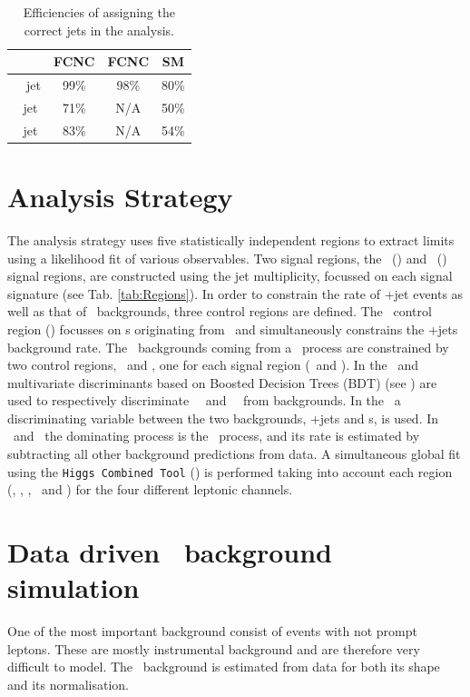 \begin{table}[htbp]
	\centering
	\caption{Efficiencies of assigning the correct jets in the analysis.}
	\begin{tabular}{cccc}
		\toprule
		& FCNC \tZq  & FCNC \tZ & SM \tZq \\ 
		\midrule
		\SM\ \Pbottom\ jet & 99\% & 98\% & 80\%\\ 
		\Pcharm\ jet  & 71\% & N/A & 50\% \\  
		\Pup\ jet  & 83\% & N/A & 54\% \\ 
		\bottomrule
	\end{tabular} 
	\label{tab:matching2}
\end{table}


\section{Analysis Strategy}
\label{sec:selection}

The analysis strategy uses five statistically independent regions to extract limits using a likelihood fit of various observables. Two signal regions, the \tZ\ (\STSR) and \tZq\ (\TTSR) signal regions, are constructed using the jet multiplicity,  focussed on each signal signature (see Tab. \ref{tab:Regions}).  In order to constrain the rate of \WZ+jet events as well as that of \NPL\ backgrounds, three control regions are defined. The \WZ\ control region (\WZCR) focusses on \NPL s originating from \DY\ and simultaneously constrains the \WZ+jets background rate. The \NPL\ backgrounds coming from a \ttbar\ process are constrained by two control regions, \TTCR\ and \STCR, one for each signal region (\TTSR\ and \STSR).  In the \STSR\ and \TTSR\, multivariate discriminants based on Boosted Decision Trees (BDT) (see ) are used to respectively discriminate \FCNC\ \tZ\ and \FCNC\ \tZq\ from backgrounds. In the \WZCR\ a  discriminating variable between the two backgrounds, \WZ+jets and \NPL s, is used. In \TTCR\ and \STCR\, the dominating process is the \ttbar\ process, and its rate is estimated by subtracting all other background predictions from data. A simultaneous global fit using the \texttt{Higgs Combined Tool} () is performed taking into account each region (\STSR, \TTSR, \WZCR, \TTCR\ and \STCR) for the four different leptonic channels. 


\section{Data driven \NPL\ background simulation}
\label{sec:NPL}
 One of the most important background consist of events with not prompt leptons. These are mostly instrumental background and are therefore very difficult to model. The \NPL\ background is estimated from data for both its shape and its normalisation. 

